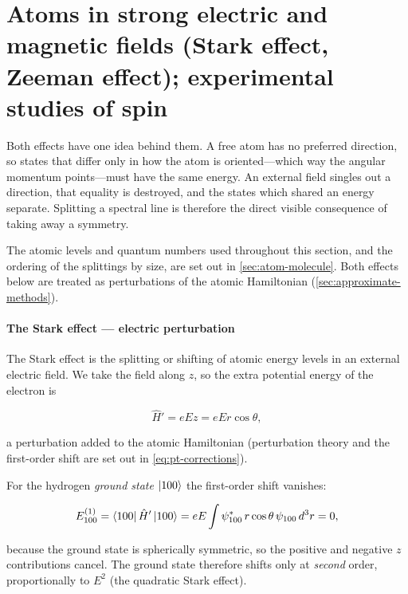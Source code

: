 \section{Atoms in strong electric and magnetic fields (Stark effect, Zeeman effect); experimental studies of spin}
\label{sec:atoms-fields}

    Both effects have one idea behind them. A free atom has no preferred direction, so states that differ only in how the atom is oriented---which way the angular momentum points---must have the same energy. An external field singles out a direction, that equality is destroyed, and the states which shared an energy separate. Splitting a spectral line is therefore the direct visible consequence of taking away a symmetry.

    The atomic levels and quantum numbers used throughout this section, and the ordering of the splittings by size, are set out in \cref{sec:atom-molecule}. Both effects below are treated as perturbations of the atomic Hamiltonian (\cref{sec:approximate-methods}).

    \paragraph{The Stark effect --- electric perturbation}

    The Stark effect is the splitting or shifting of atomic energy levels in an external electric field. We take the field along $z$, so the extra potential energy of the electron is

    \begin{equation*}
        \hat{H}' = eEz = eEr\cos\theta,
    \end{equation*}

    a perturbation added to the atomic Hamiltonian (perturbation theory and the first-order shift are set out in \cref{eq:pt-corrections}).

    For the hydrogen \emph{ground state} $\ket{100}$ the first-order shift vanishes:

    \begin{equation*}
        E^{(1)}_{100} = \bra{100}\hat{H}'\ket{100} = eE\int\psi^*_{100}\,r\cos\theta\,\psi_{100}\,d^3r = 0,
    \end{equation*}

    because the ground state is spherically symmetric, so the positive and negative $z$ contributions cancel. The ground state therefore shifts only at \emph{second} order, proportionally to $E^2$ (the quadratic Stark effect).

